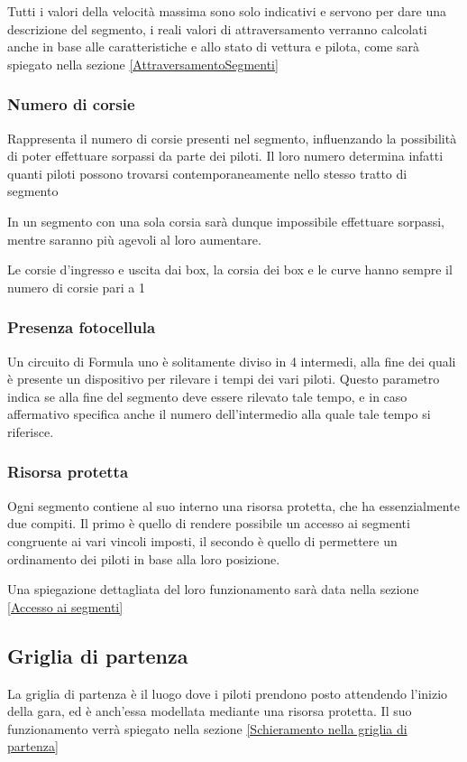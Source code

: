 \documentclass[a4paper,11pt, twoside]{book}
\begin{document}
	  Tutti i valori della velocità massima sono solo indicativi e servono per dare una descrizione del segmento,
	  i reali valori di attraversamento verranno calcolati anche in base alle caratteristiche e allo stato di 
	  vettura e pilota, come sarà spiegato nella sezione \ref{AttraversamentoSegmenti}
	    
	\subsubsection{Numero di corsie}
	  Rappresenta il numero di corsie presenti nel segmento, influenzando la possibilità
	  di poter effettuare sorpassi da parte dei piloti. Il loro numero determina infatti quanti piloti possono trovarsi
	  contemporaneamente nello stesso tratto di segmento
	  
	  In un segmento con una sola corsia sarà dunque impossibile effettuare sorpassi, mentre saranno più agevoli
	  al loro aumentare.
	  
	  Le corsie d'ingresso e uscita dai box, la corsia dei box e le curve hanno sempre il numero di corsie pari
	  a 1
	  
	\subsubsection{Presenza fotocellula}
	  Un circuito di Formula uno è solitamente diviso in 4 intermedi, alla fine dei quali
	  è presente un dispositivo per rilevare i tempi dei vari piloti. Questo parametro
	  indica se alla fine del segmento deve essere rilevato tale tempo, e in caso affermativo
	  specifica anche il numero dell'intermedio alla quale tale tempo si riferisce.
	

	\subsubsection{Risorsa protetta}
	  Ogni segmento contiene al suo interno una risorsa protetta, che ha essenzialmente due compiti. Il primo
	  è quello di rendere possibile un accesso ai segmenti congruente ai vari vincoli imposti, 
	  il secondo è quello di permettere un ordinamento dei piloti in base alla loro posizione.
	  
	  Una spiegazione dettagliata del loro funzionamento sarà data nella sezione \ref{Accesso ai segmenti}
	  
      \subsection{Griglia di partenza}
	La griglia di partenza è il luogo dove i piloti prendono posto attendendo l'inizio della gara, ed è anch'essa modellata
	mediante una risorsa protetta.
	Il suo funzionamento verrà spiegato nella sezione \ref{Schieramento nella griglia di partenza}
	  
\end{document}
